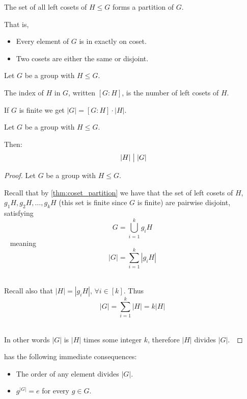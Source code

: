 \begin{thm}
    \label{thm:coset_partition}
    The set of all left cosets of $H \leq G$ forms a 
    partition of $G$. 

    That is, 
    \begin{itemize}
        \item Every element of $G$ is in exactly on coset. 
        \item Two cosets are either the same or disjoint. 
    \end{itemize}
\end{thm}

\begin{defn}
    Let $G$ be a group with $H \leq G$. 

    The index of $H$ in $G$, written $[G:H]$, is the number of 
    left cosets of $H$. 
\end{defn}

If $G$ is finite we get $|G| = [G:H] \cdot |H|$.

\newpage 
\begin{thm}
    \label{thm:lagrange} 
    Let $G$ be a group with $H \leq G$. 

    Then: 
    $$ 
        |H| \bigm\vert |G|
    $$ 
\end{thm}
\begin{proof}
    Let $G$ be a group with $H \leq G$. 

    Recall that by \cref{thm:coset_partition} we have that the 
    set of left cosets of $H$, $g_1 H, g_2 H, \ldots, g_k H$ 
    (this set is finite since $G$ is finite) are 
    pairwise disjoint, satisfying 
    $$ 
        G = \bigcup_{i=1}^k g_i H
    $$ 
    meaning 
    $$ 
        |G| = \displaystyle\sum_{i=1}^{k}|g_i H|
    $$ 

    Recall also that $|H| = |g_i H|, \, \forall i \in [k]$. 
    Thus 
    $$ 
        |G| = \displaystyle\sum_{i=1}^{k}|H| = k|H|
    $$ 

    In other words $|G|$ is $|H|$ times some integer $k$, therefore 
    $|H|$ divides $|G|$. 
\end{proof}


 has the following immediate consequences: 
\begin{itemize}
    \item The order of any element divides $|G|$. 
    \item $g^{|G|} = e$ for every $g \in G$. 
\end{itemize}

